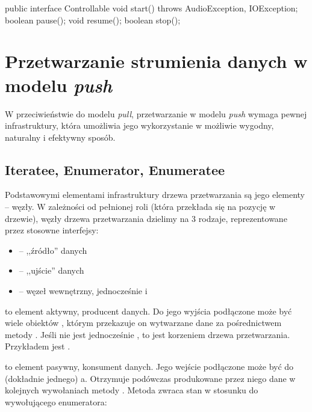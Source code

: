\begin{java}
public interface Controllable {
    void start() throws AudioException, IOException;
    boolean pause();
    void resume();
    boolean stop();
}
\end{java}

\chapter{Przetwarzanie strumienia danych w modelu \emph{push}}

W przeciwieństwie do modelu \emph{pull}, przetwarzanie w modelu \emph{push} wymaga pewnej
infrastruktury, która umożliwia jego wykorzystanie w możliwie wygodny, naturalny i efektywny sposób.

\section{Iteratee, Enumerator, Enumeratee}

Podstawowymi elementami infrastruktury drzewa przetwarzania są jego elementy -- węzły. W zależności
od pełnionej roli (która przekłada się na pozycję w drzewie), węzły drzewa przetwarzania dzielimy na
3 rodzaje, reprezentowane przez stosowne interfejsy:

\begin{itemize}

  \item {} -- ,,źródło'' danych

  \item {} -- ,,ujście'' danych

  \item {} -- węzeł wewnętrzny, jednocześnie  i 

\end{itemize}

 to element aktywny, producent danych. Do jego wyjścia podłączone może być wiele
obiektów , którym przekazuje on wytwarzane dane za pośrednictwem metody .
Jeśli  nie jest jednocześnie , to jest korzeniem drzewa
przetwarzania.  Przykładem  jest .

 to element pasywny, konsument danych. Jego wejście podłączone może być do (dokładnie
jednego) a. Otrzymuje podówczas produkowane przez niego dane w kolejnych
wywołaniach metody . Metoda  zwraca stan  w stosunku do
wywołującego  enumeratora:

